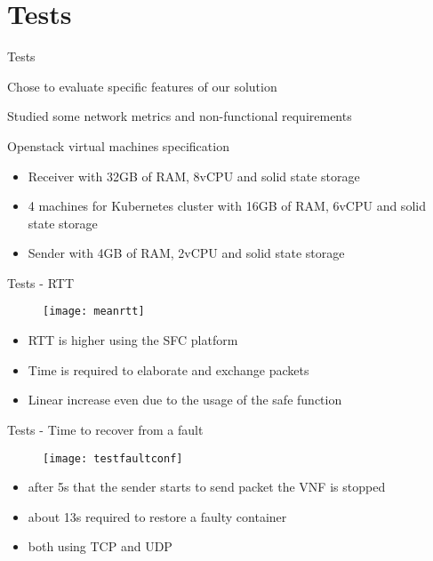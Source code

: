 \section{Tests}

\begin{frame}{Tests}

  Chose to evaluate specific features of our solution

  \vfill{}

  Studied some network metrics and non-functional requirements

  \vfill{}

  Openstack virtual machines specification
  \begin{itemize}
    \item Receiver with 32GB of RAM, 8vCPU and solid state storage
    \item 4 machines for Kubernetes cluster with 16GB of RAM, 6vCPU and solid state storage
    \item Sender with 4GB of RAM, 2vCPU and solid state storage
  \end{itemize}

\end{frame}

\begin{frame}{Tests - RTT}

  \vspace{-1cm}

  \begin{figure}[H]
    \centering
    \texttt{[image: meanrtt]}
  \end{figure}

  \begin{itemize}
  \item RTT is higher using the SFC platform
  \item Time is required to elaborate and exchange packets
  \item Linear increase even due to the usage of the safe function
  \end{itemize}

\end{frame}

\begin{frame}{Tests - Time to recover from a fault}

  \vspace{-1cm}

  \begin{figure}[H]
    \centering
    \texttt{[image: testfaultconf]}
  \end{figure}

  \begin{itemize}
  \item after 5s that the sender starts to send packet the VNF is stopped
  \item about 13s required to restore a faulty container
  \item both using TCP and UDP
  \end{itemize}

\end{frame}